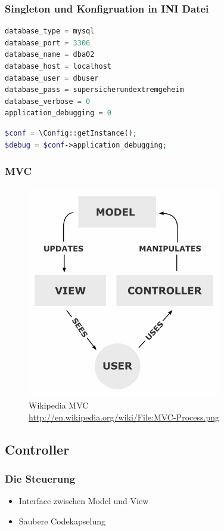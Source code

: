 \documentclass[xcolor=dvipsnames]{beamer}
\begin{document}
\begin{frame}[fragile] %
\frametitle{Singleton und Konfigruation in INI Datei} %

\begin{lstlisting}[language=PHP, caption=config.ini]
database_type = mysql
database_port = 3306
database_name = dba02
database_host = localhost
database_user = dbuser
database_pass = supersicherundextremgeheim
database_verbose = 0
application_debugging = 0
\end{lstlisting} 

\begin{lstlisting}[language=PHP, caption=Config Klasse]
$conf = \Config::getInstance();
$debug = $conf->application_debugging;
\end{lstlisting} 

\end{frame}


\begin{frame} %
\frametitle{MVC} %
\begin{figure}
\includegraphics[scale=0.4]{MVC-Process.png}
\caption{Wikipedia MVC \\ \tiny{\textcolor{gray}{\url{http://en.wikipedia.org/wiki/File:MVC-Process.png}}}}
\end{figure}
\end{frame}


\subsection{Controller}
\begin{frame} %
  \frametitle{Die Steuerung} %
  \begin{block}{}
	  \begin{itemize}
  		\item Interface zwischen Model und View
  		\item Saubere Codekapselung
	  \end{itemize}
  \end{block} 
\end{frame}
\end{document}
